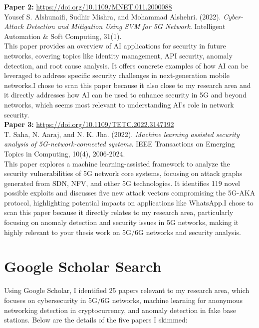 \documentclass[10pt]{article}
\begin{document}
\noindent \textbf{Paper 2:} \url{https://doi.org/10.1109/MNET.011.2000088} \\
Yousef S. Alshunaifi, Sudhir Mishra, and Mohammad Alshehri. (2022). \textit{Cyber-Attack Detection and Mitigation Using SVM for 5G Network}. Intelligent Automation \& Soft Computing, 31(1).\\

\noindent This paper provides an overview of AI applications for security in future networks, covering topics like identity management, API security, anomaly detection, and root cause analysis. It offers concrete examples of how AI can be leveraged to address specific security challenges in next-generation mobile networks.I chose to scan this paper because it also close to my research area and  it directly addresses how AI can be used to enhance security in 5G and beyond networks, which seems most relevant to understanding AI's role in network security.\\

\noindent\textbf{Paper 3:} \url{https://doi.org/10.1109/TETC.2022.3147192} \\
T. Saha, N. Aaraj, and N. K. Jha. (2022). \textit{Machine learning assisted security analysis of 5G-network-connected systems}. IEEE Transactions on Emerging Topics in Computing, 10(4), 2006-2024.\\

\noindent This paper explores a machine learning-assisted framework to analyze the security vulnerabilities of 5G network core systems, focusing on attack graphs generated from SDN, NFV, and other 5G technologies. It identifies 119 novel possible exploits and discusses five new attack vectors compromising the 5G-AKA protocol, highlighting potential impacts on applications like WhatsApp.I chose to scan this paper because it directly relates to my research area, particularly focusing on anomaly detection and security issues in 5G networks, making it highly relevant to your thesis work on 5G/6G networks and security analysis.

\section{ Google Scholar Search}

Using Google Scholar, I identified 25 papers relevant to my research area, which focuses on cybersecurity in 5G/6G networks, machine learning for anonymous networking detection in cryptocurrency, and anomaly detection in fake base stations. Below are the details of the five papers I skimmed:\\
\end{document}
